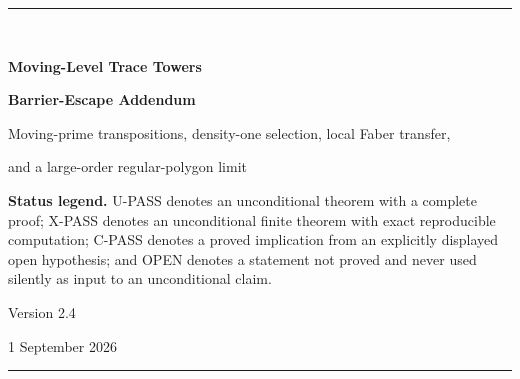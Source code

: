 \documentclass[11pt]{article}
\theoremstyle{keio}
\theoremstyle{keioinput}
\newcommand{\UPASS}{\textcolor{passgreen}{\textsf{U-PASS}}}
\newcommand{\XPASS}{\textcolor{xpassblue}{\textsf{X-PASS}}}
\newcommand{\CPASS}{\textcolor{cpassviolet}{\textsf{C-PASS}}}
\newcommand{\OPEN}{\textcolor{openred}{\textsf{OPEN}}}
\begin{document}
\hypersetup{pageanchor=false}
\begin{titlepage}
\thispagestyle{empty}
\vspace*{20mm}
{\color{navy}\rule{\textwidth}{1.2pt}}\\[12mm]
{\Huge\bfseries\color{navy}Moving-Level Trace Towers\par}
\vspace{4mm}
{\LARGE\bfseries Barrier-Escape Addendum\par}
\vspace{8mm}
{\large Moving-prime transpositions, density-one selection, local Faber transfer,\par
and a large-order regular-polygon limit\par}
\vfill
\begin{statusbox}
\textbf{Status legend.}
\UPASS{} denotes an unconditional theorem with a complete proof;
\XPASS{} denotes an unconditional finite theorem with exact reproducible
computation; \CPASS{} denotes a proved implication from an explicitly
displayed open hypothesis; and \OPEN{} denotes a statement not proved and
never used silently as input to an unconditional claim.
\end{statusbox}
\vfill
{\large Version 2.4\par}
{\small 1 September 2026\par}
\vspace{7mm}
{\color{navy}\rule{\textwidth}{1.2pt}}
\end{titlepage}
\hypersetup{pageanchor=true}
\end{document}

